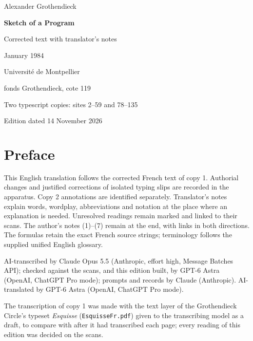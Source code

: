 \documentclass[11pt,a4paper]{article}
\newcommand{\EditionTitle}{Sketch of a Program}
\newcommand{\EditionForm}{Corrected text with translator’s notes}
\begin{document}
\hypersetup{pageanchor=false}
\begin{titlepage}
\centering
\vspace*{18mm}
{\Large Alexander Grothendieck\par}
\vspace{12mm}
{\Huge\bfseries\EditionTitle\par}
\vspace{8mm}
{\Large\EditionForm\par}
\vspace{14mm}
{\large January 1984\par}
\vfill
{\large Université de Montpellier\par fonds Grothendieck, cote 119\par}
\vspace{8mm}
{\normalsize Two typescript copies: sites 2--59 and 78--135\par}
\vspace{8mm}
{\normalsize Edition dated 14 November 2026\par}
\end{titlepage}
\hypersetup{pageanchor=true}
\thispagestyle{plain}
\section*{Preface}

This English translation follows the corrected French text of copy 1. Authorial changes and justified corrections of isolated typing slips are recorded in the apparatus. Copy 2 annotations are identified separately. Translator’s notes explain words, wordplay, abbreviations and notation at the place where an explanation is needed. Unresolved readings remain marked and linked to their scans. The author’s notes (1)–(7) remain at the end, with links in both directions. The formulas retain the exact French source strings; terminology follows the supplied unified English glossary.

\smallskip
AI-transcribed by Claude Opus 5.5 (Anthropic, effort high, Message Batches API); checked against the scans, and this edition built, by GPT-6 Astra (OpenAI, ChatGPT Pro mode); prompts and records by Claude (Anthropic).
AI-translated by GPT-6 Astra (OpenAI, ChatGPT Pro mode).

The transcription of copy 1 was made with the text layer of the Grothendieck Circle's typeset \textit{Esquisse} (\texttt{EsquisseFr.pdf}) given to the transcribing model as a draft, to compare with after it had transcribed each page; every reading of this edition was decided on the scans.
\end{document}
